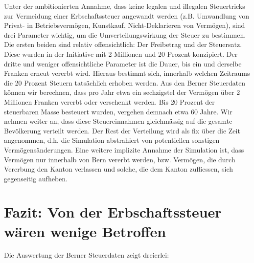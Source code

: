 \documentclass[a4paper, 12pt,liststotoc]{scrartcl}
\numberwithin{equation}{section}
\begin{document}
Unter der ambitionierten Annahme, dass keine legalen und illegalen Steuertricks zur Vermeidung einer Erbschaftssteuer angewandt werden (z.B. Umwandlung von Privat- in Betriebsvermögen, Kunstkauf, Nicht-Deklarieren von Vermögen), sind drei Parameter wichtig, um die Umverteilungswirkung der Steuer zu bestimmen. Die ersten beiden sind relativ offensichtlich: Der Freibetrag und der Steuersatz. Diese wurden in der Initiative mit 2 Millionen und 20 Prozent konzipiert. Der dritte und weniger offensichtliche Parameter ist die Dauer, bis ein und derselbe Franken erneut vererbt wird. Hieraus bestimmt sich, innerhalb welchen Zeitraums die 20 Prozent Steuern tatsächlich erhoben werden. Aus den Berner Steuerdaten können wir berechnen, dass pro Jahr etwa ein sechzigstel der Vermögen über 2 Millionen Franken vererbt oder verschenkt werden. Bis 20 Prozent der steuerbaren Masse besteuert wurden, vergehen demnach etwa 60 Jahre.  Wir nehmen weiter an, dass diese Steuereinnahmen gleichmässig auf die gesamte Bevölkerung verteilt werden. Der Rest der Verteilung wird als fix über die Zeit angenommen, d.h. die Simulation abstrahiert von potentiellen sonstigen Vermögensänderungen. Eine weitere implizite Annahme der Simulation ist, dass Vermögen nur innerhalb von Bern vererbt werden, bzw. Vermögen, die durch Vererbung den Kanton verlassen und solche, die dem Kanton zufliessen, sich gegenseitig aufheben.

\section{Fazit: Von der Erbschaftssteuer wären wenige
Betroffen}\label{fazit-von-der-erbschaftssteuer-wuxe4ren-wenige-betroffen}

Die Auswertung der Berner Steuerdaten zeigt dreierlei:
\end{document}
